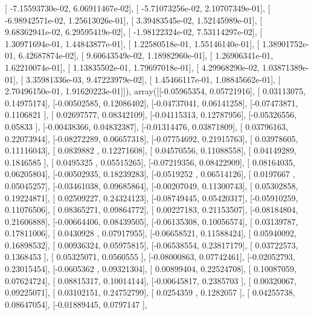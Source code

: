\documentclass{article}
\begin{document}
       [ -7.15593730e-02,   6.06911467e-02],
       [ -5.71073256e-02,   2.10707349e-01],
       [ -6.98942571e-02,   1.25613026e-01],
       [  3.39483545e-02,   1.52145989e-01],
       [  9.68362941e-02,   6.29595419e-02],
       [ -1.98122324e-02,   7.53114297e-02],
       [  1.30971694e-01,   1.44843877e-01],
       [  1.22580518e-01,   1.55146140e-01],
       [  1.38901752e-01,   6.42687874e-02],
       [  9.60643549e-02,   1.18982960e-01],
       [  1.26906341e-01,   1.62210074e-01],
       [  1.13835502e-01,   1.79697018e-01],
       [  4.29968290e-02,   1.03871389e-01],
       [  3.35981336e-03,   9.47223979e-02],
       [  1.45466117e-01,   1.08845662e-01],
       [  2.70496150e-01,   1.91620223e-01]]), array([[-0.05965354,  0.05721916],
       [ 0.03113075,  0.14975174],
       [-0.00502585,  0.12086402],
       [-0.04737041,  0.06141258],
       [-0.07473871,  0.1106821 ],
       [ 0.02697577,  0.08342109],
       [-0.04115313,  0.12787956],
       [-0.05326556,  0.05833   ],
       [-0.00438366,  0.04832387],
       [-0.01314476,  0.03871809],
       [ 0.03796163,  0.22073944],
       [-0.08272289,  0.06657318],
       [-0.07754692,  0.21915763],
       [ 0.03978605,  0.11116043],
       [ 0.0839882 ,  0.12271608],
       [ 0.04570556,  0.11088558],
       [ 0.04149289,  0.1846585 ],
       [ 0.0495325 ,  0.05515265],
       [-0.07219356,  0.08422909],
       [ 0.08164035,  0.06205804],
       [-0.00502935,  0.18239283],
       [-0.0519252 ,  0.06514126],
       [ 0.0197667 ,  0.05045257],
       [-0.03461038,  0.09685864],
       [-0.00207049,  0.11300743],
       [ 0.05302858,  0.19224871],
       [ 0.02509227,  0.24324123],
       [-0.08749445,  0.05420317],
       [-0.05910259,  0.11076506],
       [ 0.08365271,  0.09864772],
       [ 0.00227183,  0.21153507],
       [-0.08184804,  0.21606888],
       [-0.00664406,  0.08439505],
       [-0.06135308,  0.10056574],
       [ 0.03139787,  0.17811006],
       [ 0.0430928 ,  0.07917955],
       [-0.06658521,  0.11588424],
       [ 0.05940092,  0.16898532],
       [ 0.00936324,  0.05975815],
       [-0.06538554,  0.23817179],
       [ 0.03722573,  0.1368453 ],
       [ 0.05325071,  0.0560555 ],
       [-0.08000863,  0.07742461],
       [-0.02052793,  0.23015454],
       [-0.0605362 ,  0.09321304],
       [ 0.00899404,  0.22524708],
       [ 0.10087059,  0.07624724],
       [ 0.08815317,  0.10014144],
       [-0.00645817,  0.2385703 ],
       [ 0.00320067,  0.09225071],
       [ 0.03102151,  0.24752799],
       [ 0.0254359 ,  0.1282057 ],
       [ 0.04255738,  0.08647054],
       [-0.01889445,  0.0797147 ],
\end{document}
